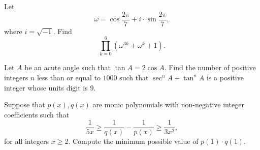 \documentclass[11pt]{article}
\theoremstyle{definition}
\begin{document}
%	






\begin{question}[name={2023 AIME II, \href{https://artofproblemsolving.com/community/c4p27101186}{Problem 8}}]
	Let $$\omega=\cos\frac{2\pi}{7}+i\cdot\sin\frac{2\pi}{7},$$ where $i=\sqrt{-1}$. Find
	$$\prod_{k=0}^{6}(\omega^{3k}+\omega^k+1).$$
\end{question}




%	







\begin{question}[name={2023 AIME II, \href{https://artofproblemsolving.com/community/c4p27101686}{Problem 13}}]
	Let $A$ be an acute angle such that $\tan A = 2\cos A$. Find the number of positive integers $n$ less than or equal to $1000$ such that $\sec^n A + \tan^n A$ is a positive integer whose units digit is $9$.
\end{question}




%	





\begin{question}[name={2023 Stanford Math Tournament, \href{https://artofproblemsolving.com/community/c383h3065192p27653658}{Algebra \#10}}]
	Suppose that $p(x),q(x)$ are monic polynomials with non-negative integer coefficients such that
	\[\frac{1}{5x}\ge\frac{1}{q(x)}-\frac{1}{p(x)}\ge\frac{1}{3x^2},\]for all integers $x\ge2$. Compute the minimum possible value of $p(1)\cdot q(1)$.
\end{question}
\end{document}
